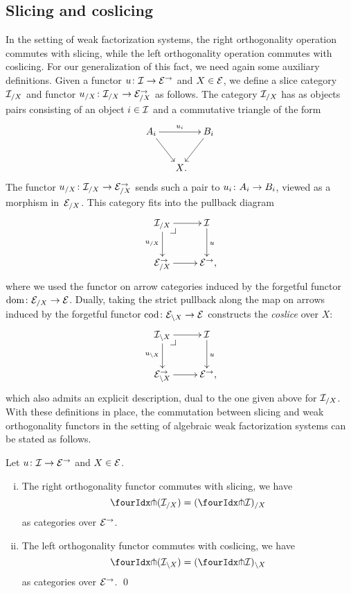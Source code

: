 \documentclass[reqno,10pt,a4paper,oneside,draft]{amsart}
\begin{document}
\subsection*{Slicing and coslicing}
In the setting of weak factorization systems, the right orthogonality operation commutes with slicing, while the left orthogonality operation commutes with coslicing. For our generalization of this fact, we need 
again some auxiliary definitions.
Given a functor $u \co \cal{I} \to \catE^\to$ and $X \in \catE$, we define a slice category $\cal{I}_{/X}$ and functor $u_{/X} \co \cal{I}_{/X} \to \catE_{/X}^\to$ as follows.
The category $\cal{I}_{/X}$ has as objects pairs consisting of an object $i \in \cal{I}$ and a commutative triangle of the form
\[
\xymatrix@C-1em{
  A_i
  \ar[dr]
  \ar[rr]^{u_i}
&&
  B_i
  \ar[dl]
\\&
  X
\rlap{.}}
\]
The functor $u_{/X} \co \cal{I}_{/X} \to \catE_{/X}^\to$ sends such a pair to $u_i \co A_i \to B_i$, viewed as a morphism in~$\catE_{/X}$.
This category fits into the pullback diagram
\[
\xymatrix{
  \cal{I}_{/X}
  \ar[r]
  \ar[d]_{u_{/X}}
  \pullback{dr}
&
  \cal{I}
  \ar[d]^{u}
\\
  \catE_{/X}^\to
  \ar[r]
&
  \catE^\to
\rlap{,}}
\]
where we used the functor on arrow categories induced by the forgetful functor $\dom \co \catE_{/X} \to \catE$.
Dually, taking the strict pullback along the map on arrows induced by the forgetful functor $\operatorname{cod} \co \catE_{\backslash X} \to \catE$ constructs the \emph{coslice} over $X$:
\[
\xymatrix{
  \cal{I}_{\backslash X}
  \ar[r]
  \ar[d]_{u_{\backslash X}}
  \pullback{dr}
&
  \cal{I}
  \ar[d]^{u}
\\
  \catE_{\backslash X}^\to
  \ar[r]
&
  \catE^\to
\rlap{,}}
\]
which also admits an explicit description, dual to the one given above for $\cal{I}_{/X}$.
With these definitions in place, the commutation between 
slicing and weak orthogonality functors in the setting of algebraic weak factorization 
systems can be stated as follows.

\begin{proposition} \label{pitchfork-slicing}
Let $u \co \cal{I} \to \catE^\to$ and $X \in \cal{E}$.
\begin{enumerate}[(i)]
\item The right orthogonality functor commutes with slicing, \ie we have
\[
  \liftr{(\cal{I}_{/X})} = (\liftr{\cal{I}})_{/X}
\]
as categories over $\catE^\to$.
\item The left orthogonality functor commutes with coslicing, \ie we have
\[
  \liftl{(\cal{I}_{\backslash X})} = (\liftl{\cal{I}})_{\backslash X}
\]
as categories over $\catE^\to$.
\qed
\end{enumerate}
\end{proposition}
\end{document}
